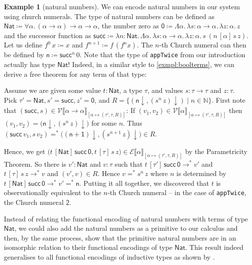 \documentclass[12pt]{article}
\theoremstyle{plain}
\theoremstyle{definition}
\newtheorem{exmpl}[equation]{Example}
\newcommand{\denot}[1]{\llbracket#1\rrbracket}
\newcommand{\haskell}[1]{\texttt{#1}}
\newcommand{\vint}[1]{\mathcal{V}\denot{#1}}
\newcommand{\tint}[1]{\mathcal{E}\denot{#1}}
\newcommand{\nat}{\mathsf{Nat}}
\newcommand{\zero}{\mathsf{0}}
\newcommand{\suc}{\mathsf{succ}}
\newcommand{\nf}[1]{#1{\downarrow}}
\newcommand{\eqnf}{=^*}
\begin{document}
\begin{exmpl}[natural numbers]
We can encode natural numbers in our system using church numerals.
The type of natural numbers can be defined as $\nat\coloneqq \forall \alpha.\, (\alpha\to\alpha)\to\alpha\to\alpha$,
the number zero as $\zero\coloneqq \Lambda \alpha.\,\lambda s : \alpha\to\alpha.\,\lambda z : \alpha.\, z$
and the successor function as
$\suc\coloneqq \lambda n : \nat.\,\Lambda \alpha.\,\lambda s : \alpha\to\alpha.\,\lambda z : \alpha.\, s\ (n\, [\alpha]\, s\, z)$.
Let us define $f^0\, x\coloneqq x$ and $f^{n+1}\coloneqq f\, (f^n x)$.
The $n$-th Church numeral can then be defined by $\mathsf{n}\coloneqq \suc^n\, 0$.
Note that the type of \haskell{appTwice} from our introduction actually has type $\nat$!
Indeed, in a similar style to \cref{exmpl:boolterms}, we can derive a free theorem for any term of that type:

Assume we are given some value $t : \nat$, a type $\tau$, and values $s : \tau\to\tau$ and $z : \tau$.
Pick $\tau'=\nat,s'=\suc,z'=\zero$, and $R=\bigl\{(\nf{\mathsf{n}},\nf{(s^n\, z)})\mid n\in\mathbb{N}\bigr\}$.
First note that $(\suc, s)\in\vint{\alpha\to\alpha}_{[\alpha\mapsto(\tau',\tau,R)]}$:
If $(v_1,v_2)\in\vint{\alpha}_{[\alpha\mapsto(\tau',\tau,R)]}$
then $(v_1,v_2)=\bigl(\nf{\mathsf{n}},\nf{(s^n\, z)}\bigr)$ for some $n$.
Thus $(\suc\,v_1,s\,v_2)\eqnf\bigl(\nf{(\mathsf{n+1})},\nf{(s^{n+1}\, z)}\bigr)\in R$.

Hence, we get $\bigl(t\,[\nat]\,\suc\,\zero,t\,[\tau]\,s\,z\bigr)\in\tint{\alpha}_{[\alpha\mapsto(\tau',\tau,R)]}$ by the Parametricity Theorem.
So there is $v' : \nat$ and $v : \tau$ such that
$t\,[\tau']\,\suc\,\zero\to^*v'$ and $t\,[\tau]\,s\,z\to^*v$ and $(v',v)\in R$.
Hence $v \eqnf s^n\, z$ where $n$ is determined by $t\,[\nat]\,\suc\,\zero\to^*v'\eqnf\mathsf{n}$.
Putting it all together, we discovered that $t$ is observationally equivalent to the $n$-th Church numeral -- in the case of \haskell{appTwice}, the Church numeral $\mathsf{2}$.
\end{exmpl}

Instead of relating the functional encoding of natural numbers with
terms of type $\nat$,
we could also add the natural numbers as a primitive to our calculus and then,
by the same process, show that the primitive natural numbers are in an isomorphic
relation to their functional encodings of type $\nat$.
This result indeed generalises to all functional encodings of inductive types
as shown by \citet{10.1007/BFb0037118}.
\end{document}
